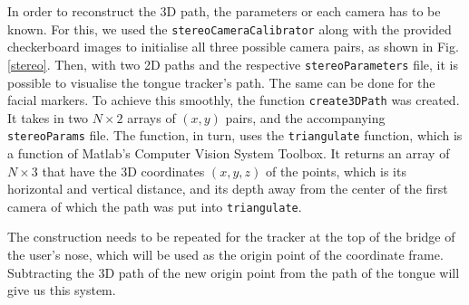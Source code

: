 \documentclass[journal]{IEEEtran}
\begin{document}
In order to reconstruct the 3D path, the parameters or each camera has to be known. For this, we used the \texttt{stereoCameraCalibrator} along with the provided checkerboard images to initialise all three possible camera pairs, as shown in Fig. \ref{stereo}. Then, with two 2D paths and the respective \texttt{stereoParameters} file, it is possible to visualise the tongue tracker's path. The same can be done for the facial markers. To achieve this smoothly, the function \texttt{create3DPath} was created. It takes in two $N\times2$ arrays of $(x,y)$ pairs, and the accompanying \texttt{stereoParams} file. The function, in turn, uses the \texttt{triangulate} function, which is a function of Matlab's Computer Vision System Toolbox. It returns an array of $N\times3$ that have the 3D coordinates $(x,y,z)$ of the points, which is its horizontal and vertical distance, and its depth away from the center of the first camera of which the path was put into \texttt{triangulate}. 

The construction needs to be repeated for the tracker at the top of the bridge of the user's nose, which will be used as the origin point of the coordinate frame. Subtracting the 3D path of the new origin point from the path of the tongue will give us this system.
\end{document}
